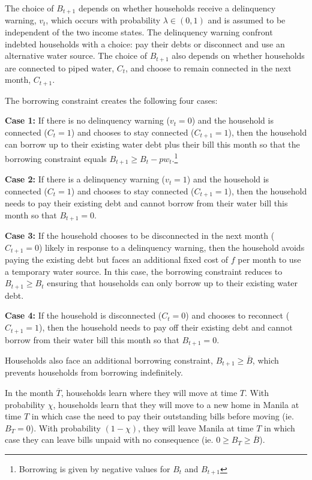 \documentclass[12pt,table]{article}
\begin{document}
The choice of $B_{t+1}$ depends on whether households receive a delinquency warning, $v_t$, which occurs with probability $\lambda \in (0,1)$ and is assumed to be independent of the two income states.  The delinquency warning confront indebted households with a choice: pay their debts or disconnect and use an alternative water source.  The choice of $B_{t+1}$ also depends on whether households are connected to piped water, $C_t$, and choose to remain connected in the next month, $C_{t+1}$.  


The borrowing constraint creates the following four cases:

\textbf{Case 1:} If there is no delinquency warning ($v_t=0$) and the household is connected ($C_{t}=1$) and chooses to stay connected ($C_{t+1}=1$), then the household can borrow up to their existing water debt plus their bill this month so that the borrowing constraint equals $B_{t+1}\geq B_t -  p w_t $.\footnote{Borrowing is given by negative values for $B_t$ and $B_{t+1}$}

\textbf{Case 2:} If there is a delinquency warning ($v_t=1$) and the household is connected ($C_t=1$) and chooses to stay connected ($C_{t+1}=1$), then the household needs to pay their existing debt and cannot borrow from their water bill this month so that $B_{t+1} = 0$.

\textbf{Case 3:} If the household chooses to be disconnected in the next month ($C_{t+1}=0$) likely in response to a delinquency warning, then the household avoids paying the existing debt but faces an additional fixed cost of $f$ per month to use a temporary water source.  In this case, the borrowing constraint reduces to $ B_{t+1} \geq B_t$ ensuring that households can only borrow up to their existing water debt.  

\textbf{Case 4:} If the household is disconnected ($C_t=0$) and chooses to reconnect ($C_{t+1}=1$), then the household needs to pay off their existing debt and cannot borrow from their water bill this month so that $B_{t+1} = 0$.  

Households also face an additional borrowing constraint, $ B_{t+1} \geq \overline{B}$, which prevents households from borrowing indefinitely.  

In the month $\overline{T}$, households learn where they will move at time $T$. With probability $\chi$, households learn that they will move to a new home in Manila at time $T$ in which case the need to pay their outstanding bills before moving (ie. $B_T=0$).  With probability $(1-\chi)$, they will leave Manila at time $T$ in which case they can leave bills unpaid with no consequence (ie. $0\geq B_T \geq \overline{B}$).
\end{document}
